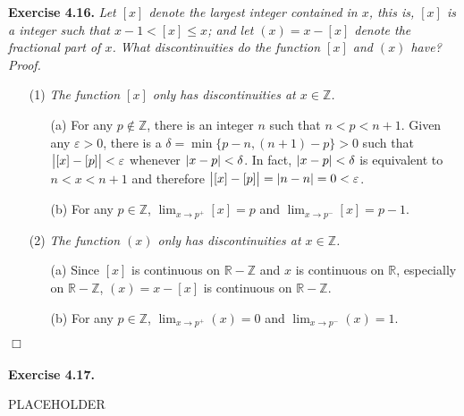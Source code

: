 \documentclass{article}
\begin{document}
\textbf{Exercise 4.16.}
\emph{Let $[x]$ denote the largest integer contained in $x$, this is,
$[x]$ is a integer such that $x-1 < [x] \leq x$;
and let $(x) = x - [x]$ denote the fractional part of $x$.
What discontinuities do the function $[x]$ and $(x)$ have?} \\

\emph{Proof.}

\begin{enumerate}
\item[(1)]
\emph{The function $[x]$ only has discontinuities at $x \in \mathbb{Z}$.}
  \begin{enumerate}
  \item[(a)]
  For any $p \not\in \mathbb{Z}$,
  there is an integer $n$ such that $n < p < n+1$.
  Given any $\varepsilon > 0$, there is a $\delta = \min\{p-n, (n+1)-p\} > 0$
  such that $\abs{[x] - [p]} < \varepsilon$
  whenever $\abs{x - p} < \delta$.
  In fact, $\abs{x - p} < \delta$ is equivalent to $n < x < n+1$
  and therefore $\abs{[x] - [p]} = \abs{n - n} = 0 < \varepsilon$.
  \item[(b)]
  For any $p \in \mathbb{Z}$,
  $\lim_{x \to p^{+}}[x] = p$ and $\lim_{x \to p^{-}}[x] = p-1$.
  \end{enumerate}
\item[(2)]
\emph{The function $(x)$ only has discontinuities at $x \in \mathbb{Z}$.}
  \begin{enumerate}
  \item[(a)]
  Since $[x]$ is continuous on $\mathbb{R} - \mathbb{Z}$ and
  $x$ is continuous on $\mathbb{R}$, especially on $\mathbb{R} - \mathbb{Z}$,
  $(x) = x - [x]$ is continuous on $\mathbb{R} - \mathbb{Z}$.
  \item[(b)]
  For any $p \in \mathbb{Z}$,
  $\lim_{x \to p^{+}}(x) = 0$ and $\lim_{x \to p^{-}}(x) = 1$.
  \end{enumerate}
\end{enumerate}
$\Box$ \\\\





\textbf{Exercise 4.17.}



PLACEHOLDER \\\\



\end{document}
